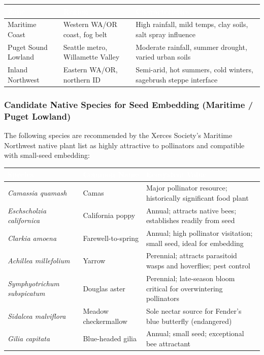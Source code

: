 \documentclass[11pt,letterpaper]{article}
\newcommand{\tableheader}[1]{\textbf{\sffamily\textcolor{white}{#1}}}
\begin{document}
\begin{center}
\begin{tabularx}{\textwidth}{L{3.2cm}L{3.5cm}X}
\toprule
{}
\tableheader{Zone} & \tableheader{Region} & \tableheader{Characteristics} \\
\midrule
Maritime Coast & Western WA/OR coast, fog belt & High rainfall, mild temps, clay soils, salt spray influence \\
Puget Sound Lowland & Seattle metro, Willamette Valley & Moderate rainfall, summer drought, varied urban soils \\
Inland Northwest & Eastern WA/OR, northern ID & Semi-arid, hot summers, cold winters, sagebrush steppe interface \\
\bottomrule
\end{tabularx}
\end{center}

\subsubsection{Candidate Native Species for Seed Embedding (Maritime / Puget Lowland)}
The following species are recommended by the Xerces Society's Maritime Northwest native plant list as highly attractive to pollinators and compatible with small-seed embedding:

\begin{center}
\begin{tabularx}{\textwidth}{L{3.8cm}L{3cm}X}
\toprule
{}
\tableheader{Species} & \tableheader{Common Name} & \tableheader{Ecosystem Value} \\
\midrule
\textit{Camassia quamash} & Camas & Major pollinator resource; historically significant food plant \\
\textit{Eschscholzia californica} & California poppy & Annual; attracts native bees; establishes readily from seed \\
\textit{Clarkia amoena} & Farewell-to-spring & Annual; high pollinator visitation; small seed, ideal for embedding \\
\textit{Achillea millefolium} & Yarrow & Perennial; attracts parasitoid wasps and hoverflies; pest control \\
\textit{Symphyotrichum subspicatum} & Douglas aster & Perennial; late-season bloom critical for overwintering pollinators \\
\textit{Sidalcea malviflora} & Meadow checkermallow & Sole nectar source for Fender's blue butterfly (endangered) \\
\textit{Gilia capitata} & Blue-headed gilia & Annual; small seed; exceptional bee attractant \\
\bottomrule
\end{tabularx}
\end{center}
\end{document}
